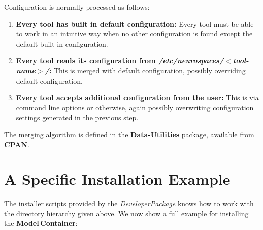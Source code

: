 \documentclass[12pt]{article}
\begin{document}
Configuration is normally processed as follows:
\begin{enumerate}
\item {\bf Every tool has built in default configuration:} Every tool must be able to work in an intuitive way when no other configuration is found except the default built-in configuration.
\item {\bf Every tool reads its configuration from {\it /etc/neurospaces/$<$tool-name$>$/}:} This is merged with default configuration, possibly overriding default configuration.
\item {\bf Every tool accepts additional configuration from the user:} This is via command line options or otherwise, again possibly overwriting configuration settings generated in the previous step. 
\end{enumerate}
The merging algorithm is defined in the \href{http://search.cpan.org/dist/Data-Utilities/}{\bf Data-Utilities} package, available from \href{http://www.cpan.org/}{\bf CPAN}.

\section*{A Specific Installation Example}

The installer scripts provided by the {\it DeveloperPackage} knows how to work with the directory hierarchy given above. We now show a full example for installing the {\bf Model\,Container}:
\end{document}
